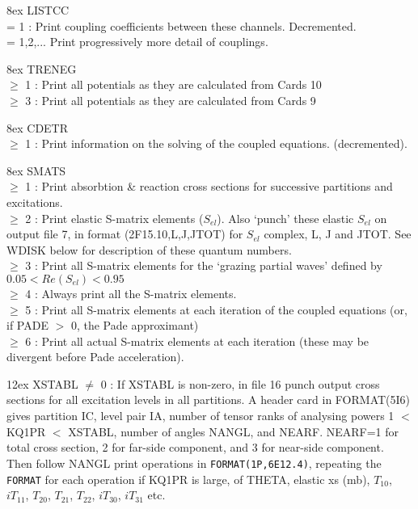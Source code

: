 \documentclass[11pt]{article}
\begin{document}
\hangindent 8ex  LISTCC
\\  = 1 : Print coupling coefficients between these channels. Decremented.
\\  = 1,2,... Print progressively more detail of couplings.



\hangindent 8ex  TRENEG
\\  $\geq$ 1 : Print all potentials as they are calculated from Cards 10
\\  $\geq$ 3 : Print all potentials as they are calculated from Cards 9



\hangindent 8ex  CDETR
\\  $\geq$ 1 : Print information on the solving of the coupled equations.
(decremented).

\hangindent 8ex
SMATS
\\  $\geq$ 1 : Print absorbtion \& reaction cross sections for successive
partitions and excitations.
\\  $\geq$ 2 : Print elastic S-matrix elements ($S_{el}$).
Also `punch' these elastic $S_{el}$ on output file 7,
in format (2F15.10,L,J,JTOT) for $S_{el}$ complex, L, J and JTOT.
See WDISK below for description of these quantum numbers.
\\  $\geq$ 3 : Print all S-matrix elements for the `grazing partial waves'
defined by $0.05 < Re(S_{el}) < 0.95$
\\  $\geq$ 4 : Always print all the S-matrix elements.
\\  $\geq$ 5 : Print all S-matrix elements at each iteration of the coupled
equations (or, if PADE  $>$ 0, the Pade approximant)
\\  $\geq$ 6 : Print all actual S-matrix elements at each iteration (these
may be divergent before Pade acceleration).





\hangindent 12ex
XSTABL $\neq$ 0 : If XSTABL is non-zero, in file 16 punch output cross sections
for all excitation levels in all partitions.
A header card in FORMAT(5I6) gives partition IC, level pair IA,
number of tensor ranks of analysing powers 1 $<$ KQ1PR $<$ XSTABL,
number of angles NANGL, and NEARF.  NEARF=1 for total cross section,
2 for far-side component, and 3 for near-side component.
\\
Then follow NANGL print operations in
{\tt FORMAT(1P,6E12.4)}, repeating
the {\tt FORMAT} for each operation if KQ1PR is large,
of THETA, elastic xs (mb), $T_{10}$, $iT_{11}$,
$T_{20}$, $ T_{21}$, $ T_{22}$, $ iT_{30}$, $ iT_{31}$
etc.
\end{document}
